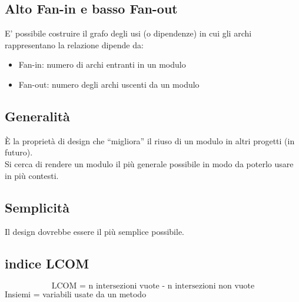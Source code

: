 \subsection{Alto Fan-in e basso Fan-out}
E’ possibile costruire il grafo degli usi (o dipendenze) in cui gli archi rappresentano la relazione dipende da:
\begin{itemize}
    \item Fan-in: numero di archi entranti in un modulo
    \item Fan-out: numero degli archi uscenti da un modulo
\end{itemize}

\subsection{Generalità}
\`E la proprietà di design che “migliora” il riuso di un modulo in altri progetti (in futuro).\\
Si cerca di rendere un modulo il più generale possibile in modo da poterlo usare in più contesti.

\subsection{Semplicità}
Il design dovrebbe essere il più semplice possibile.

\subsection{indice LCOM}
$$\text{LCOM = n intersezioni vuote - n intersezioni non vuote}$$
Insiemi = variabili usate da un metodo